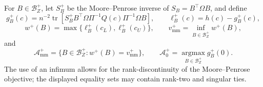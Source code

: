 For \(B\in\mathcal B_Z^+\), let \(S_B^+\) be the Moore--Penrose inverse of \(S_B=B^{\top}\Omega B\), and define
\[
 g_B^+(c)=n^{-2}\operatorname{tr}\!\left[S_B^+B^{\top}\Omega\Pi^{-1}Q(c)\Pi^{-1}\Omega B\right],
 \qquad
 \ell_B^+(c)=h(c)-g_B^+(c),
\]
\[
 w^+(B)=\max\{\ell_B^+(c_L),\ell_B^+(c_U)\},
 \qquad
 v_{\mathrm{mm}}^+=\inf_{B\in\mathcal B_Z^+}w^+(B),
\]
and
\[
 \mathcal A_{\mathrm{mm}}^+=\{B\in\mathcal B_Z^+:w^+(B)=v_{\mathrm{mm}}^+\},
 \qquad
 \mathcal A_0^+=\operatorname*{argmax}_{B\in\mathcal B_Z^+}g_B^+(0).
\]
The use of an infimum allows for the rank-discontinuity of the Moore--Penrose objective; the displayed equality sets may contain rank-two and singular ties.